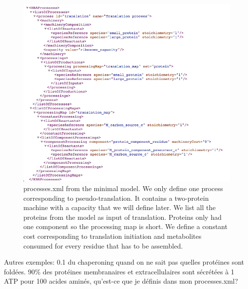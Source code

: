 \begin{figure}
  \centering
  \includegraphics[scale=0.6]{figures/processes_ex_2}
  \caption{processes.xml from the minimal model.
  We only define one process corresponding to pseudo-translation.
  It contains a two-protein machine with a capacity that we will define later.
  We list all the proteins from the model as input of translation.
  Proteins only had one component so the processing map is short.
  We define a constant cost corresponding to translation initiation
  and metabolites consumed for every residue that has to be assembled. }
  \label{fig:processes_ex_2}
\end{figure}

Autres exemples:
0.1 du chaperoning quand on ne sait pas quelles protéines sont foldées.
90\% des protéines membranaires et extracellulaires sont sécrétées à 1 ATP pour 100 acides aminés, qu’est-ce que je définis dans mon processes.xml?
